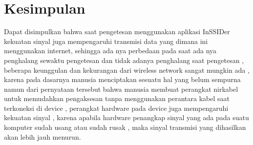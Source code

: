 \documentclass[conference]{IEEEtran}
\begin{document}
\section{Kesimpulan}
Dapat disimpulkan bahwa saat pengetesan menggunakan aplikasi InSSIDer kekuatan sinyal juga mempengaruhi transmisi data yang dimana ini menggunakan internet,
sehingga ada nya perbedaan pada saat ada nya penghalang sewaktu pengetesan dan tidak adanya penghalang saat pengetesan , beberapa keunggulan dan kekurangan dari wireless network 
sangat mungkin ada , karena pada dasarnya manusia menciptakan sesuatu hal yang belum sempurna namun dari pernyataan tersebut bahwa manusia membuat perangkat nirkabel untuk memudahkan pengaksesan 
tanpa menggunakan perantara kabel saat terkoneksi di device , perangkat hardware pada device juga mempengaruhi kekuatan sinyal , karena apabila hardware penangkap sinyal yang ada pada suatu komputer sudah usang atau sudah rusak , maka sinyal transmisi yang dihasilkan akan lebih jauh menurun.



\end{document}
